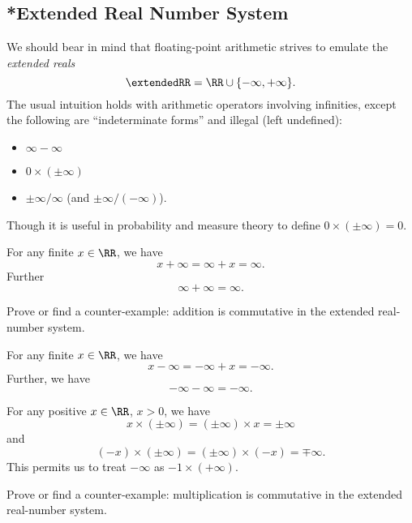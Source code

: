 \subsection{*Extended Real Number System}\label{subsec:computer:extended-real-number-system}

We should bear in mind that  floating-point arithmetic strives
to emulate the \emph{extended reals}
\begin{equation}
  \extendedRR = \RR\cup\{-\infty,+\infty\}.
\end{equation}
The usual intuition holds with arithmetic operators involving
infinities, except the following are ``indeterminate forms'' and illegal
(left undefined):
\begin{itemize}
\item $\infty-\infty$
\item $0\times(\pm\infty)$
\item $\pm\infty/\infty$ (and $\pm\infty/(-\infty)$).
\end{itemize}
Though it is useful in probability and measure theory to define
$0\times(\pm\infty)=0$.

\begin{axiom}[Addition]
  For any finite $x\in\RR$, we have
  $$x+\infty=\infty+x=\infty.$$
  Further
  $$\infty+\infty=\infty.$$
\end{axiom}


\begin{xca}
  Prove or find a counter-example: addition is commutative in the
  extended real-number system.
\end{xca}


\begin{axiom}[Subtraction]
  For any finite $x\in\RR$, we have
  $$x-\infty=-\infty+x=-\infty.$$
  Further, we have
  $$-\infty-\infty=-\infty.$$
\end{axiom}


\begin{axiom}[Multiplication]
  For any positive $x\in\RR$, $x>0$, we have
  $$x\times(\pm\infty)=(\pm\infty)\times x = \pm\infty$$
  and
  $$(-x)\times(\pm\infty)=(\pm\infty)\times(-x)=\mp\infty.$$
  This permits us to treat $-\infty$ as $-1\times(+\infty)$.
\end{axiom}


\begin{xca}
  Prove or find a counter-example: multiplication is commutative in the
  extended real-number system.
\end{xca}


